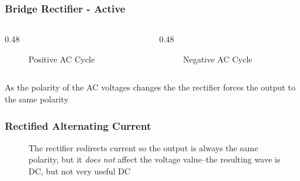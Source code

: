\begin{frame}
    \frametitle{Bridge Rectifier - Active}

    \begin{columns}
        \begin{column}{0.48\linewidth}
            \begin{figure}
                \centering
                \resizebox{0.9\columnwidth}{!}{
                    
                }

                {\tiny Positive AC Cycle\par}
            \end{figure}
        \end{column}
        \begin{column}{0.48\linewidth}
            \begin{figure}
                \centering
                \resizebox{\columnwidth}{!}{
                    
                }
                
                {\tiny Negative AC Cycle\par}
            \end{figure}
        \end{column}
    \end{columns}

    \vspace{0.5em}
    \centering
    {\footnotesize As the polarity of the AC voltages changes the the rectifier forces the output to the same polarity\par}

\end{frame}

\begin{frame}
    \frametitle{Rectified Alternating Current}

    \begin{figure}
        \centering
        \resizebox{0.75\linewidth}{!}{
            
        }

        {\footnotesize The rectifier redirects current so the output is always the same polarity, but it \emph{does not} affect the voltage value--the resulting wave is DC, but not very useful DC\par}

    \end{figure}

\end{frame}

